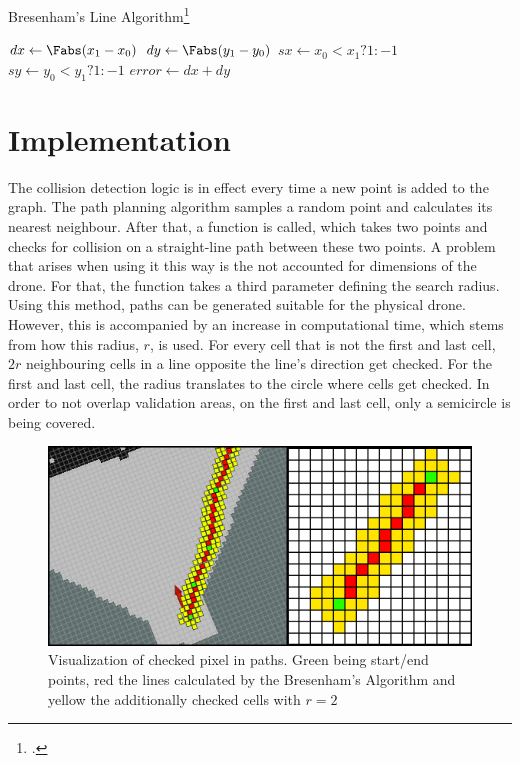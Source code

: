 \begin{algorithm}[]
	\caption{Bresenham's Line Algorithm\footcite{Zingl2012}}
	$dx \gets \Fabs(x_1-x_0)$\;
	$dy \gets \Fabs(y_1-y_0)$\;
	$sx \gets x_0<x_1 ? 1 : -1$\;
	$sy \gets y_0<y_1 ? 1 : -1$\;
	$error \gets dx + dy$\;
\end{algorithm}



\section{Implementation}
The collision detection logic is in effect every time a new point is added to the graph. The path planning algorithm samples a random point and calculates its nearest neighbour. After that, a function is called, which takes two points and checks for collision on a straight-line path between these two points.\newline
A problem that arises when using it this way is the not accounted for dimensions of the drone. For that, the function takes a third parameter defining the search radius. Using this method, paths can be generated suitable for the physical drone. However, this is accompanied by an increase in computational time, which stems from how this radius, $r$, is used. For every cell that is not the first and last cell, $2r$ neighbouring cells in a line opposite the line's direction get checked. For the first and last cell, the radius translates to the circle where cells get checked. In order to not overlap validation areas, on the first and last cell, only a semicircle is being covered. 

\begin{figure}[h]
	\centering
	\includegraphics[width=0.8\linewidth]{img/CheckedPixels}
	\caption{Visualization of checked pixel in paths. Green being start/end points, red the lines calculated by the Bresenham's Algorithm and yellow the additionally checked cells with $r = 2$}
	\label{fig:collision_detection_checkedPixels}
\end{figure}

